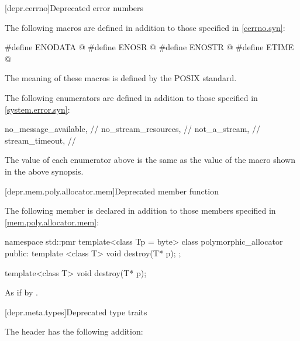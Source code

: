 [depr.cerrno]{Deprecated error numbers}

\pnum
The following macros are defined in addition to those
specified in \ref{cerrno.syn}:

%
%
%
%
\begin{codeblock}
#define ENODATA @\seebelow@
#define ENOSR @\seebelow@
#define ENOSTR @\seebelow@
#define ETIME @\seebelow@
\end{codeblock}

\pnum
The meaning of these macros is defined by the POSIX standard.

\pnum
The following  enumerators are defined
in addition to those specified in \ref{system.error.syn}:

\begin{codeblock}
no_message_available,               // 
no_stream_resources,                // 
not_a_stream,                       // 
stream_timeout,                     // 
\end{codeblock}

\pnum
The value of each  enumerator above
is the same as the value of the  macro
shown in the above synopsis.

[depr.mem.poly.allocator.mem]{Deprecated  member function}

\pnum
The following member is declared in addition to those members
specified in \ref{mem.poly.allocator.mem}:

\begin{codeblock}
namespace std::pmr {
  template<class Tp = byte>
  class polymorphic_allocator {
  public:
    template <class T>
      void destroy(T* p);
  };
}
\end{codeblock}

%
\begin{itemdecl}
template<class T>
  void destroy(T* p);
\end{itemdecl}

\begin{itemdescr}
\pnum
\effects
As if by .
\end{itemdescr}

[depr.meta.types]{Deprecated type traits}

\pnum
The header 
has the following addition:

